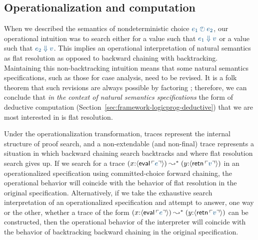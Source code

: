

\subsection{Operationalization and computation}
\label{sec:flatresolution}

When we described the semantics of nondeterministic choice $\obj{e_1
  \arb e_2}$, our operational intuition was to search either for a
value such that $\obj{e_1 \Downarrow v}$ or a value such that
$\obj{e_2 \Downarrow v}$. This implies an operational interpretation
of natural semantics as flat resolution as opposed to backward
chaining with backtracking. Maintaining this non-backtracking
intuition means that some natural semantics specifications, such as
those for case analysis, need to be revised. It is a folk theorem
that such revisions are always
possible by factoring \cite{poswolsky03factoring}; therefore, we can
conclude that {\it in the context of natural semantics specifications}
the form of deductive computation
(Section~\ref{sec:framework-logicprog-deductive}) that we are most
interested in is flat resolution.

Under the operationalization transformation, traces represent the
internal structure of proof search, and a non-extendable (and
non-final) trace represents a situation in which backward chaining
search backtracks and where flat resolution search gives up. If we
search for a trace $(x{:}\susp{{\sf eval}\,\interp{e}}) \leadsto^*
(y{:}\susp{{\sf retn}\,\interp{v}})$ in an operationalized
specification using committed-choice forward chaining, the operational
behavior will coincide with the behavior of flat resolution in the
original specification. Alternatively, if we take the exhaustive search
interpretation of an operationalized specification and attempt to
answer, one way or the other, whether a trace of the form
$(x{:}\susp{{\sf eval}\,\interp{e}}) \leadsto^* (y{:}\susp{{\sf
    retn}\,\interp{v}})$ can be constructed, then the operational
behavior of the interpreter will coincide with the behavior of
backtracking backward chaining in the original specification.

